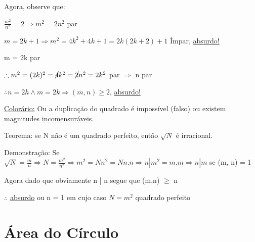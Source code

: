 \documentclass[a4paper, 12pt]{article}
\begin{document}
    Agora, observe que:
    
    \begin{center}
    $\frac{m^2}{n^2} = 2 \Rightarrow m^2 = 2n^2$ par 
    \newline
    
    $m = 2k + 1 \Rightarrow m^2 = 4k^2 + 4k + 1 = 2k(2k + 2) + 1$ Ímpar, \underline{absurdo!}
    
    {m = 2k par}
    
    $\therefore m^2 = (2k)^2 = \cancel{4}k^2 = \cancel{2}n^2 = 2k^2$ par $\Rightarrow$ n par
    \newline
    
    $\therefore n = 2h \wedge  m = 2k \Rightarrow (m,n) \ge 2$, \underline{absurdo!}
    \newline
    \end{center}
    
    \underline{Colorário:} Ou a duplicação do quadrado é impossível (falso) ou existem magnitudes \underline{incomensuráveis}.
    \newline
    
    Teorema: se N não é um quadrado perfeito, então $\sqrt{N}$ é irracional.
    \newline
    
    Demonstração: Se $\sqrt{N} = \frac{m}{n} \Rightarrow N = \frac{m^2}{n^2} \Rightarrow m^2 = Nn^2 = Nn.n \Rightarrow n | m^2 = m.m \Rightarrow n | m$ se (m, n) = 1 
    \newline
    
    Agora dado que obviamente n | n segue que (m,n) $\ge$ n
    \newline
    
    $\therefore$ \underline{absurdo} ou n = 1 em cujo caso $N = m^2$ quadrado perfeito
    
    \newpage
    \section{Área do Círculo}
\end{document}
